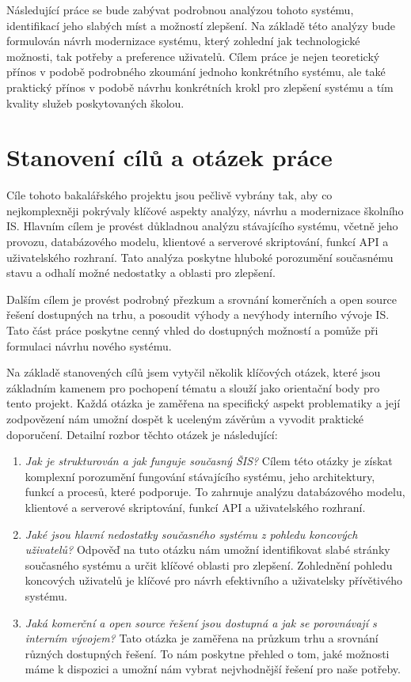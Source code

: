 \documentclass[FM,Proj]{tulthesis}
\begin{document}
Následující práce se bude zabývat podrobnou analýzou tohoto systému, 
identifikací jeho slabých míst a možností zlepšení. Na základě této analýzy 
bude formulován návrh modernizace systému, který zohlední jak technologické 
možnosti, tak potřeby a preference uživatelů. Cílem práce je nejen teoretický 
přínos v podobě podrobného zkoumání jednoho konkrétního systému, ale také 
praktický přínos v podobě návrhu konkrétních krokl pro zlepšení systému a 
tím kvality služeb poskytovaných školou.

\section{Stanovení cílů a otázek práce}
Cíle tohoto bakalářského projektu jsou pečlivě vybrány tak, aby co 
nejkomplexněji pokrývaly klíčové aspekty analýzy, návrhu a modernizace školního 
IS. Hlavním cílem je provést důkladnou analýzu stávajícího systému, včetně 
jeho provozu, databázového modelu, klientové a serverové skriptování, funkcí 
API a uživatelského rozhraní. Tato analýza poskytne hluboké porozumění současnému
stavu a odhalí možné nedostatky a oblasti pro zlepšení.

Dalším cílem je provést podrobný přezkum a srovnání komerčních a open source řešení
dostupných na trhu, a posoudit výhody a nevýhody interního vývoje IS. Tato část 
práce poskytne cenný vhled do dostupných možností a pomůže při formulaci 
návrhu nového systému.

Na základě stanovených cílů jsem vytyčil několik klíčových otázek, které 
jsou základním kamenem pro pochopení tématu a slouží jako orientační body pro tento 
projekt. Každá otázka je zaměřena na specifický aspekt problematiky a její 
zodpovězení nám umožní dospět k uceleným závěrům a vyvodit praktické doporučení. 
Detailní rozbor těchto otázek je následující:

\begin{enumerate}
\item \textit{Jak je strukturován a jak funguje současný ŠIS?} 
Cílem této otázky je získat komplexní porozumění fungování stávajícího systému, 
jeho architektury, funkcí a procesů, které podporuje. To zahrnuje analýzu 
databázového modelu, klientové a serverové skriptování, funkcí API a uživatelského rozhraní.

\item \textit{Jaké jsou hlavní nedostatky současného systému z pohledu koncových uživatelů?}
 Odpověď na tuto otázku nám umožní identifikovat slabé stránky současného systému a 
 určit klíčové oblasti pro zlepšení. Zohlednění pohledu koncových uživatelů je 
 klíčové pro návrh efektivního a uživatelsky přívětivého systému.

\item \textit{Jaká komerční a open source řešení jsou dostupná a jak se porovnávají s 
interním vývojem?} Tato otázka je zaměřena na průzkum trhu a srovnání různých dostupných 
řešení. To nám poskytne přehled o tom, jaké možnosti máme k dispozici a umožní nám vybrat 
nejvhodnější řešení pro naše potřeby.
\end{enumerate}
\end{document}
